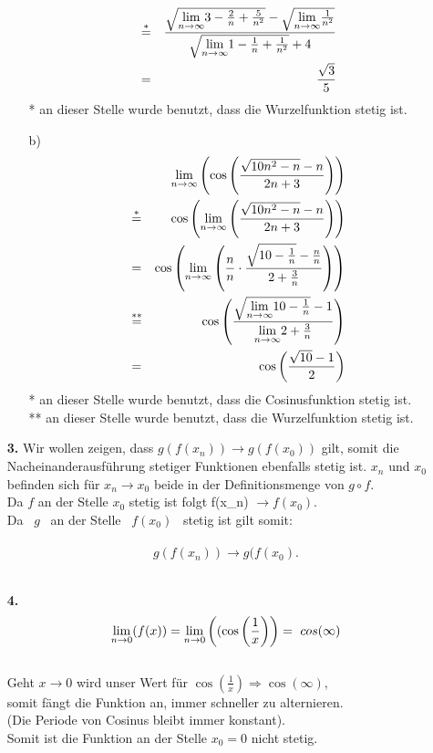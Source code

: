 \documentclass[a4paper,12pt]{article}
\begin{document}
\begin{enumerate}
\begin{enumerate}
\begin{align*}
                        & \overset{*}{=} & \frac{\sqrt{\underset{n \to \infty}{\lim} 3-\frac{2}{n}+\frac{5}{n^2}}-\sqrt{\underset{n \to \infty}{\lim} \frac{1}{n^2}}}
                        {\sqrt{\underset{n \to \infty}{\lim} 1-\frac{1}{n}+\frac{1}{n^2}}+4} \\
                        &=& \frac{\sqrt{3}}{5}
                    \end{align*}
                    * an dieser Stelle wurde benutzt, dass die Wurzelfunktion stetig ist.
                \item[b)]
                    \begin{align*}
                        &&\underset{n \to \infty}{\lim} \left( \cos \left( \frac{\sqrt{10n^2 -n}-n}{2n+3} \right) \right) \\
                        & \overset{*}{=} & \cos \left( \underset{n \to \infty}{\lim} \left( \frac{\sqrt{10n^2 -n}-n}{2n+3} \right) \right) \\
                        &=& \cos \left( \underset{n \to \infty}{\lim} \left( \frac{n}{n} \cdot \frac{\sqrt{10-\frac{1}{n}}-\frac{n}{n}}{2+\frac{3}{n}} \right) \right) \\
                        & \overset{**}{=} & \cos \left( \frac{\sqrt{\underset{n \to \infty}{\lim} 10-\frac{1}{n}}-1}{\underset{n \to \infty}{\lim} 2+\frac{3}{n}} \right) \\
                        &=& \cos \left( \frac{\sqrt{10}-1}{2} \right)
                    \end{align*}
                    * an dieser Stelle wurde benutzt, dass die Cosinusfunktion stetig ist. \\
                    ** an dieser Stelle wurde benutzt, dass die Wurzelfunktion stetig ist.
            \end{enumerate}
        \item[\textbf{3.}]    
                Wir wollen zeigen, dass  $g(f(x_n)) \rightarrow g(f(x_0))$  gilt,  somit die Nacheinanderausführung stetiger Funktionen ebenfalls stetig ist.
               $ x_n $ und  $x_0 $ befinden sich für  $x_n \rightarrow x_0 $ beide in der Definitionsmenge von  $g \circ f $.\\
                Da  $f $ an der Stelle  $x_0 $ stetig ist folgt  f(x_n) $\rightarrow f(x_0).$ \\
                Da \ $g$ \  an der Stelle \ $f(x_0)$ \  stetig ist gilt somit:\\ \\
                $$g(f(x_n)) \rightarrow g(f(x_0).$$\\
            

        \item[\textbf{4.}]
                $$ \underset{n \to 0}{\lim} (f(x)) = \underset{n \to 0}{\lim} \left((\cos\left(\frac{1}{x}\right)\right) = \ cos(\infty) $$ \\
                Geht  $x \rightarrow 0$  wird unser Wert für  $\cos(\frac{1}{x}) \Rightarrow \cos(\infty)$,
                \\somit fängt die Funktion an, immer schneller zu alternieren.\\ (Die Periode von Cosinus bleibt immer konstant). \\ Somit ist die Funktion an der Stelle $x_0 = 0$ nicht stetig.


\end{enumerate}
\end{document}
